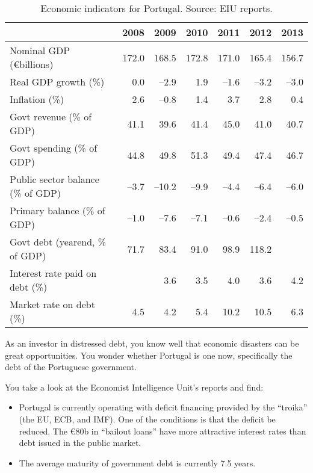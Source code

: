 \documentclass[letterpaper,12pt]{exam}
\begin{document}
\begin{questions}
\begin{table}[h]
\centering
{\small
\begin{tabular}{lrrrrrr}
\toprule
        & 2008 & 2009 & 2010 & 2011 & 2012 & 2013 \\
\midrule
Nominal GDP (\euro billions) & 172.0 & 168.5 & 172.8 & 171.0 & 165.4 & 156.7 \\
Real GDP growth (\%) & 0.0 & --2.9 & 1.9 & --1.6 & --3.2 & --3.0 \\
Inflation (\%) & 2.6 & --0.8 & 1.4 & 3.7 & 2.8 & 0.4 \\
Govt revenue (\% of GDP)  & 41.1 & 39.6 & 41.4 & 45.0 & 41.0 & 40.7 \\
Govt spending (\% of GDP) & 44.8 & 49.8 & 51.3 & 49.4 & 47.4 & 46.7  \\
Public sector balance (\% of GDP) & --3.7 & --10.2 & --9.9 & --4.4 & --6.4 & --6.0\\
Primary balance (\% of GDP)  & --1.0 & --7.6 &  --7.1 & --0.6 & --2.4 & --0.5   \\
Govt debt (yearend, \% of GDP) & 71.7 & 83.4 & 91.0 & 98.9 & 118.2 \\
Interest rate paid on debt (\%) &  & 3.6 & 3.5 & 4.0 & 3.6	& 4.2 \\
Market rate on debt (\%)        & 4.5 & 4.2 & 5.4 & 10.2 & 10.5 & 6.3 \\
\bottomrule
\end{tabular}
}
\label{tab:portugal}
\caption{Economic indicators for Portugal.  Source:  EIU reports.}
\end{table}

As an investor in distressed debt,
you know well that economic disasters can be great opportunities.
You wonder whether Portugal is one now, specifically
the debt of the Portuguese government.

You take a look at the Economist Intelligence Unit's reports
and find:
\begin{itemize}
\item Portugal is currently operating with deficit financing
provided by the ``troika'' (the EU, ECB, and IMF).
One of the conditions is that the deficit be reduced.
The \euro 80b in ``bailout loans'' have more attractive interest rates
than debt issued in the public market.

\item The average maturity of government debt is currently 7.5 years.


\end{itemize}
\end{questions}
\end{document}
